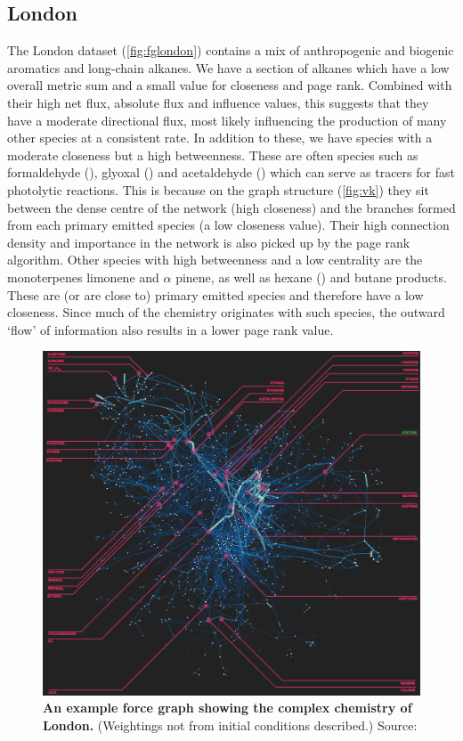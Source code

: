 \subsection*{London}
The London dataset (\autoref{fig:fglondon}) contains a mix of anthropogenic and biogenic aromatics and long-chain alkanes. We have a section of alkanes which have a low overall metric sum and a small value for closeness and page rank. Combined with their high net flux, absolute flux and influence values, this suggests that they have a moderate directional flux, most likely influencing the production of many other species at a consistent rate. In addition to these, we have species with a moderate closeness but a high betweenness. These are often species such as formaldehyde (), glyoxal () and acetaldehyde () which can serve as tracers for fast photolytic reactions. This is because on the graph structure (\autoref{fig:vk}) they sit between the dense centre of the network (high closeness) and the branches formed from each primary emitted species (a low closeness value). Their high connection density and importance in the network is also picked up by the page rank algorithm. Other species with high betweenness and a low centrality are the monoterpenes limonene and $\alpha$ pinene, as well as hexane () and butane products. These are (or are close to) primary emitted species and therefore have a low closeness. Since much of the chemistry originates with such species, the outward `flow' of information also results in a lower page rank value.

\begin{figure}[H]
     \centering
         \includegraphics[width=.95\textwidth]{figures/lewis.png}
        \caption{ \textbf{An example force graph showing the complex chemistry of London.} (Weightings not from initial conditions described.) Source: \citep{science}  }
        \label{fig:fglondon}
\end{figure}



